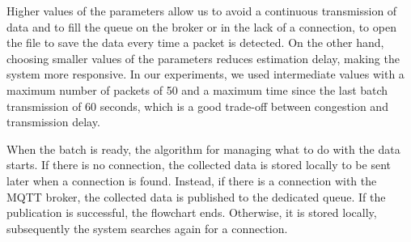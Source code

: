 Higher values of the parameters allow us to avoid a continuous transmission of data and to fill the queue on the broker or in the lack of a connection, to open the file to save the data every time a packet is detected. On the other hand, choosing smaller values of the parameters reduces estimation delay, making the system more responsive. In our experiments, we used intermediate values with a maximum number of packets of 50 and a maximum time since the last batch transmission of 60 seconds, which is a good trade-off between congestion and transmission delay.

When the batch is ready, the algorithm for managing what to do with the data starts. If there is no connection, the collected data is stored locally to be sent later when a connection is found.
Instead, if there is a connection with the MQTT broker, the collected data is published to the dedicated queue. If the publication is successful, the flowchart ends. Otherwise, it is stored locally, subsequently the system searches again for a connection.

